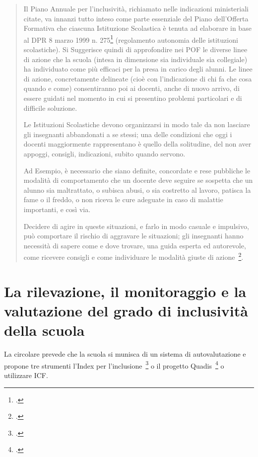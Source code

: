 \begin{quote}
	Il Piano Annuale per l'inclusività, richiamato nelle indicazioni ministeriali citate, va innanzi tutto inteso come parte essenziale del Piano dell'Offerta Formativa che ciascuna Istituzione Scolastica è tenuta ad elaborare in base al DPR 8 marzo 1999 n. 275\footcite{DPR_275_1999} (regolamento autonomia delle istituzioni scolastiche). Si Suggerisce quindi di approfondire nei POF le diverse linee di azione che la scuola (intesa in dimensione sia individuale sia collegiale) ha individuato come più efficaci per la presa in carico degli alunni. Le linee di azione, concretamente delineate (cioè con l'indicazione di chi fa che cosa quando e come) consentiranno poi ai docenti, anche di nuovo arrivo, di essere guidati nel momento in cui si presentino problemi particolari e di difficile soluzione. 
	
	Le Istituzioni Scolastiche devono organizzarsi in modo tale da non lasciare gli insegnanti abbandonati a se stessi; una delle condizioni che oggi i docenti maggiormente rappresentano è quello della solitudine, del non aver appoggi, consigli, indicazioni, subito quando servono.
	
	Ad Esempio, è necessario che siano definite, concordate e rese pubbliche le modalità di comportamento che un docente deve seguire se sospetta che un alunno sia maltrattato, o subisca abusi, o sia costretto al lavoro, patisca la fame o il freddo, o non riceva le cure adeguate in caso di malattie importanti, e così via.
	
	Decidere di agire in queste situazioni, e farlo in modo casuale e impulsivo, può comportare il rischio di aggravare le situazioni; gli insegnanti hanno necessità di sapere come e dove trovare, una guida esperta ed autorevole, come ricevere consigli e come individuare le modalità giuste di azione~\footcite{usrER2013}.
\end{quote}
\section[L'inclusività della scuola]{La rilevazione, il monitoraggio e la valutazione del grado di inclusività della scuola} La circolare prevede che la scuola si munisca di un sistema di autovalutazione e propone tre strumenti l'Index per l'inclusione~\footcite{Indexforinclusio} o il progetto Quadis~\footcite{quadis} o utilizzare ICF. 